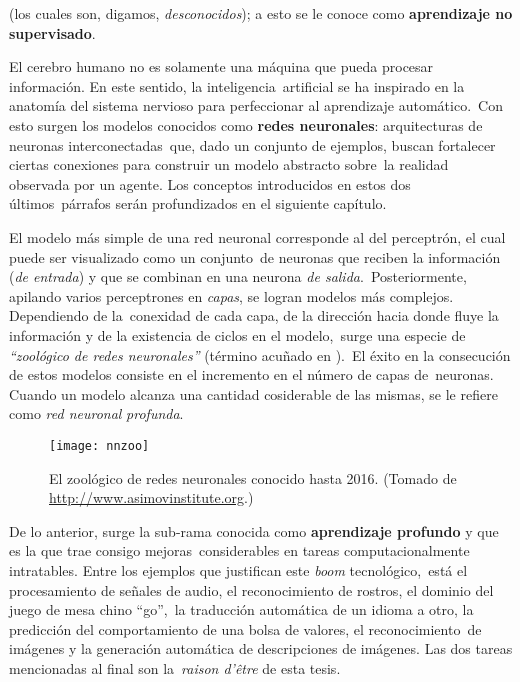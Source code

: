 (los cuales son, digamos, \emph{desconocidos}); a esto se le conoce como \textbf{aprendizaje no supervisado}.\par
El cerebro humano no es solamente una máquina que pueda procesar información. En este sentido, la inteligencia\
artificial se ha inspirado en la anatomía del sistema nervioso para perfeccionar al aprendizaje automático.\
Con esto surgen los modelos conocidos como \textbf{redes neuronales}: arquitecturas de neuronas interconectadas\
que, dado un conjunto de ejemplos, buscan fortalecer ciertas conexiones para construir un modelo abstracto sobre\
la realidad observada por un agente. Los conceptos introducidos en estos dos últimos\
párrafos serán profundizados en el siguiente capítulo.\par
El modelo más simple de una red neuronal corresponde al del perceptrón, el cual puede ser visualizado como un conjunto\
de neuronas que reciben la información (\emph{de entrada}) y que se combinan en una neurona \emph{de salida}.\
Posteriormente, apilando varios perceptrones en \emph{capas}, se logran modelos más complejos. Dependiendo de la\
conexidad de cada capa, de la dirección hacia donde fluye la información y de la existencia de ciclos en el modelo,\
surge una especie de \emph{``zoológico de redes neuronales''} (término acuñado en \cite{website:theasimovinstitute}).\
El éxito en la consecución de estos modelos consiste en el incremento en el número de capas de\
neuronas. Cuando un modelo alcanza una cantidad cosiderable de las mismas, se le refiere como \emph{red neuronal}
\emph{profunda}.

\begin{figure}[H]
  \centering
  \texttt{[image: nnzoo]}
  \caption{El zoológico de redes neuronales conocido hasta 2016.
    (Tomado de \url{http://www.asimovinstitute.org}.)
    \cite{website:theasimovinstitute}
  }
\end{figure}

De lo anterior, surge la sub-rama conocida como \textbf{aprendizaje profundo} y que es la que trae consigo mejoras\
considerables en tareas computacionalmente intratables. Entre los ejemplos que justifican este \emph{boom} tecnológico,\
está el procesamiento de señales de audio, el reconocimiento de rostros, el dominio del juego de mesa chino ``go'',\
la traducción automática de un idioma a otro, la predicción del comportamiento de una bolsa de valores, el reconocimiento\
de imágenes y la generación automática de descripciones de imágenes. Las dos tareas mencionadas al final son la\
\emph{raison d'être} de esta tesis.

